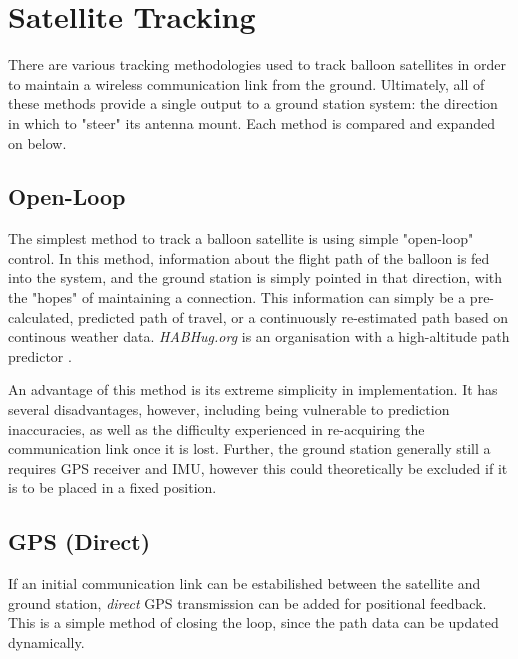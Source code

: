\graphicspath{{./figures/}}

\section{Satellite Tracking}
There are various tracking methodologies used to track balloon satellites in order to maintain a wireless communication link from the ground. Ultimately, all of these methods provide a single output to a ground station system: the direction in which to "steer" its antenna mount. Each method is compared and expanded on below.

\subsection{Open-Loop}
The simplest method to track a balloon satellite is using simple "open-loop" control. In this method, information about the flight path of the balloon is fed into the system, and the ground station is simply pointed in that direction, with the "hopes" of maintaining a connection. This information can simply be a pre-calculated, predicted path of travel, or a continuously re-estimated path based on continous weather data. \textit{HABHug.org} is an organisation with a high-altitude path predictor \cite{site-stratoballooningPredictionTracking}.

An advantage of this method is its extreme simplicity in implementation. It has several disadvantages, however, including being vulnerable to prediction inaccuracies, as well as the difficulty experienced in re-acquiring the communication link once it is lost. Further, the ground station generally still a requires GPS receiver and IMU, however this could theoretically be excluded if it is to be placed in a fixed position.

\subsection{GPS (Direct)}
If an initial communication link can be estabilished between the satellite and ground station, \textit{direct} GPS transmission can be added for positional feedback. This is a simple method of closing the loop, since the path data can be updated dynamically.

